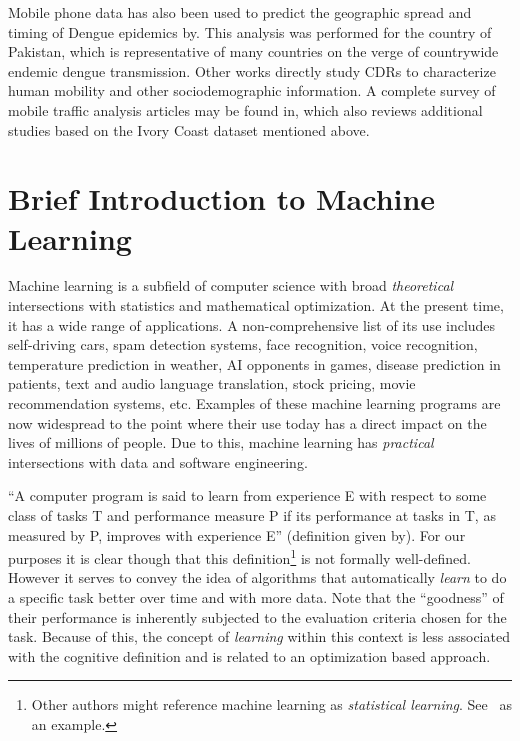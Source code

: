 Mobile phone data has also been used to predict the geographic spread and timing of Dengue epidemics by\cite{wesolowski2015impact}. This analysis was performed for the country of Pakistan, which is representative of many countries on the verge of countrywide endemic dengue transmission. Other works directly study CDRs to characterize human mobility and other sociodemographic information. A complete survey of mobile traffic analysis articles may be found in\cite{naboulsi2015mobile}, which also reviews additional studies based on the Ivory Coast dataset mentioned above.



\section{Brief Introduction to Machine Learning}

Machine learning is a subfield of computer science with broad \textit{theoretical} intersections with statistics and mathematical optimization. At the present time, it has a wide range of applications. A non-comprehensive list of its use includes self-driving cars, spam detection systems, face recognition, voice recognition, temperature prediction in weather, AI opponents in games, disease prediction in patients, text and audio language translation, stock pricing, movie recommendation systems, etc. Examples of these machine learning programs are now widespread to the point where their use today has a direct impact on the lives of millions of people. Due to this, machine learning has \textit{practical} intersections with data and software engineering.

``A computer program is said to learn from experience E with respect to some class of tasks T and performance measure P if its performance at tasks in T, as measured by P, improves with experience E'' (definition given by\cite{Mitchell-MLearning}). For our purposes it is clear though that this definition\footnote{Other authors might reference machine learning as \textit{statistical learning}. See~\cite{hastie-elemstatslearn} as an example.} is not formally well-defined. However it serves to convey the idea of algorithms that automatically \textit{learn} to do a specific task better over time and with more data. Note that the ``goodness'' of their performance is inherently subjected to the evaluation criteria chosen for the task. Because of this, the concept of \textit{learning} within this context is less associated with the cognitive definition and is related to an optimization based approach.

